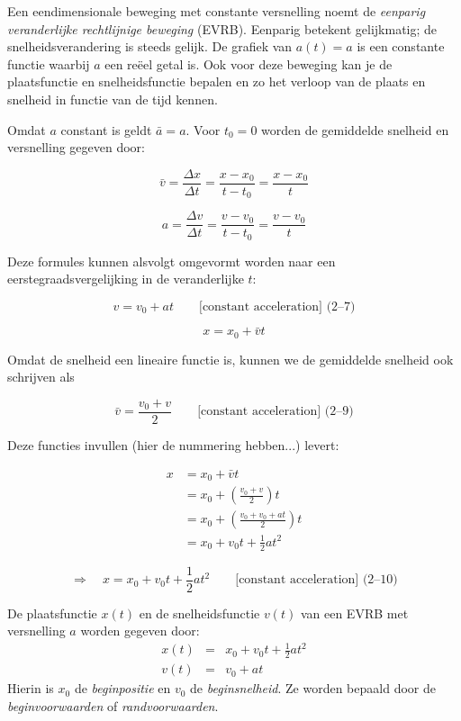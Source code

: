 \documentclass{ximera}
\begin{document}
	\author{Bart Lambregs}
    \xmsource\xmuitleg



Een eendimensionale beweging met constante versnelling noemt de  \textit{eenparig veranderlijke rechtlijnige beweging} (EVRB). Eenparig betekent gelijkmatig; de snelheidsverandering is steeds gelijk. De grafiek van $a(t)=a$ is een constante functie waarbij $a$ een reëel getal is. Ook voor deze beweging kan je de plaatsfunctie en snelheidsfunctie bepalen en zo het verloop van de plaats en snelheid in functie van de tijd kennen. 


Omdat \(a\) constant is geldt \( \bar{a} = a\). Voor \(t_0 = 0\) worden de gemiddelde snelheid en versnelling gegeven door: 

\[
\bar{v} = \frac{\Delta x}{\Delta t} = \frac{x - x_0}{t - t_0} = \frac{x - x_0}{t}
\]

\[
a = \frac{\Delta v}{\Delta t} = \frac{v - v_0}{t - t_0} = \frac{v - v_0}{t}
\]

Deze formules kunnen alsvolgt omgevormt worden naar een eerstegraadsvergelijking in de veranderlijke \(t\): 

\[
v = v_0 + at \qquad \text{[constant acceleration] (2–7)}
\]

\[
x = x_0 + \bar{v}t \tag{2–8}
\]


Omdat de snelheid een lineaire functie is, kunnen we de gemiddelde snelheid ook schrijven als 

\[
\bar{v} = \frac{v_0 + v}{2} \qquad \text{[constant acceleration] (2–9)}
\]


Deze functies invullen (hier de nummering hebben...) levert: 

\begin{align*}
	x &= x_0 + \bar{v}t \\
	  &= x_0 + \left( \frac{v_0 + v}{2} \right)t \\
	  &= x_0 + \left( \frac{v_0 + v_0 + at}{2} \right)t \\
	  &= x_0 + v_0 t + \frac{1}{2} at^2
\end{align*}

\[
\Rightarrow \quad x = x_0 + v_0 t + \frac{1}{2}at^2 \qquad \text{[constant acceleration] (2–10)}
\]







\begin{theorem}
De plaatsfunctie $x(t)$ en de snelheidsfunctie $v(t)$ van een EVRB met versnelling $a$ worden gegeven door:
\[
\begin{array}{rcl}
x(t)&=&x_0+v_0t+\frac{1}{2}at^2\\
v(t)&=&v_0+at
\end{array}
\]
Hierin is $x_0$ de \textit{beginpositie} en $v_0$ de \textit{beginsnelheid}. Ze worden bepaald door de \textit{beginvoorwaarden} of \textit{randvoorwaarden}.
\end{theorem}	
\end{document}
